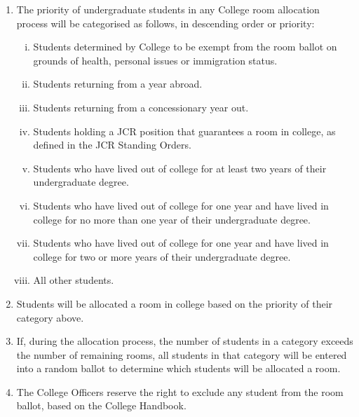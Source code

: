 \documentclass[12pt]{article}
\begin{document}
    \begin{enumerate}
        \item The priority of undergraduate students in any College room allocation process will be categorised as follows, in descending order or priority:
        \begin{enumerate}[i.]
            \item Students determined by College to be exempt from the room ballot on grounds of health, personal issues or immigration status.
            \item Students returning from a year abroad.
            \item Students returning from a concessionary year out.
            \item Students holding a JCR position that guarantees a room in college, as defined in the JCR Standing Orders.
            \item Students who have lived out of college for at least two years of their undergraduate degree.
            \item Students who have lived out of college for one year and have lived in college for no more than one year of their undergraduate degree.
            \item Students who have lived out of college for one year and have lived in college for two or more years of their undergraduate degree.
            \item All other students.
        \end{enumerate}

        \item Students will be allocated a room in college based on the priority of their category above.

        \item If, during the allocation process, the number of students in a category exceeds the number of remaining rooms, all students in that category will be entered into a random ballot to determine which students will be allocated a room.

        \item The College Officers reserve the right to exclude any student from the room ballot, based on the College Handbook.
    \end{enumerate}
\end{document}
